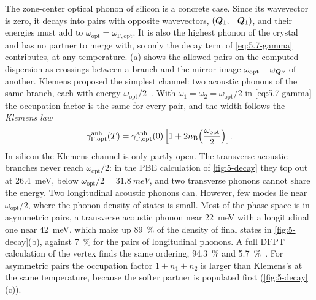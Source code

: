 The zone-center optical phonon of silicon is a concrete case. Since its wavevector is zero, it decays into pairs with opposite wavevectors, $(\bm{Q}_1, -\bm{Q}_1)$, and their energies must add to $\omega_{\mathrm{opt}} = \omega_{\mathrm{\Gamma},\mathrm{opt}}$. It is also the highest phonon of the crystal and has no partner to merge with, so only the decay term of \cref{eq:5.7-gamma} contributes, at any temperature. (a) shows the allowed pairs on the computed dispersion as crossings between a branch and the mirror image $\omega_{\mathrm{opt}} - \omega_{\bm{Q}\nu}$ of another. Klemens proposed the simplest channel: two acoustic phonons of the same branch, each with energy $\omega_{\mathrm{opt}}/2$~\cite{klemens1966anharmonic}. With $\omega_1 = \omega_2 = \omega_{\mathrm{opt}}/2$ in \cref{eq:5.7-gamma} the occupation factor is the same for every pair, and the width follows the \emph{Klemens law}
\begin{equation}
  \gamma^{\mathrm{anh}}_{\mathrm{\Gamma},\mathrm{opt}}(T) = \gamma^{\mathrm{anh}}_{\mathrm{\Gamma},\mathrm{opt}}(0)\,\Bigl[1 + 2n_{\mathrm{B}}\Bigl(\frac{\omega_{\mathrm{opt}}}{2}\Bigr)\Bigr] .
  \label{eq:5.7-klemens}
\end{equation}
In silicon the Klemens channel is only partly open. The transverse acoustic branches never reach $\omega_{\mathrm{opt}}/2$: in the PBE calculation of \cref{fig:5-decay} they top out at \SI{26.4}{meV}, below $\omega_{\mathrm{opt}}/2 = \SI{31.8}{meV}$, and two transverse phonons cannot share the energy. Two longitudinal acoustic phonons can. However, few modes lie near $\omega_{\mathrm{opt}}/2$, where the phonon density of states is small. Most of the phase space is in asymmetric pairs, a transverse acoustic phonon near \SI{22}{meV} with a longitudinal one near \SI{42}{meV}, which make up \SI{89}{\percent} of the density of final states in \cref{fig:5-decay}(b), against \SI{7}{\percent} for the pairs of longitudinal phonons. A full DFPT calculation of the vertex finds the same ordering, \SI{94.3}{\percent} and \SI{5.7}{\percent}~\cite[Table~1]{debernardi1994anharmonic}. For asymmetric pairs the occupation factor $1 + n_1 + n_2$ is larger than Klemens's at the same temperature, because the softer partner is populated first (\cref{fig:5-decay}(c)).

